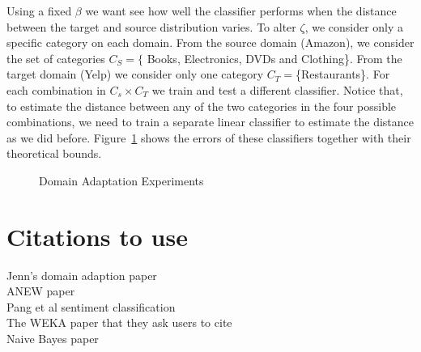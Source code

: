 \documentclass[letterpaper]{article}
\begin{document}
Using a fixed $\beta$ we want see how well the classifier performs
when the distance between the target and source distribution
varies. To alter $\zeta$, we consider only a specific category on each
domain. From the source domain (Amazon), we consider the set of
categories $C_S=\{$ Books, Electronics, DVDs and Clothing\}. From the
target domain (Yelp) we consider only one category
$C_T=$\{Restaurants\}. For each combination in $C_s\times C_T$ we train
and test a different classifier. Notice that, to estimate the distance
between any of the two categories in the four possible combinations,
we need to train a separate linear classifier to estimate the distance
as we did before. Figure~\ref{fig:domain-adaptation} shows the errors
of these classifiers together with their theoretical bounds.

\begin{figure}
  \centering
  
  \caption{Domain Adaptation Experiments}
  \label{fig:domain-adaptation}
\end{figure}

\section{Citations to use}
Jenn's domain adaption paper \cite{JennLearnDiffDomains}\\
ANEW paper \cite{DoddsANEWPaper}\\
Pang et al sentiment classification \cite{PangSentimentClassification}\\
The WEKA paper that they ask users to cite \cite{weka} \\
Naive Bayes paper \cite{naivebayes}


\end{document}
